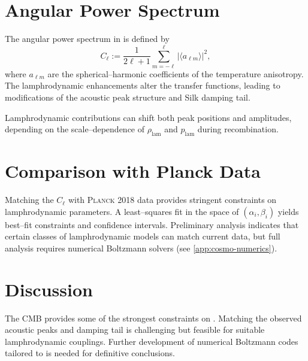 \section{Angular Power Spectrum}

The angular power spectrum in \rsvpabbr{} is defined by
\[
  C_\ell
  := \frac{1}{2\ell+1}\sum_{m=-\ell}^\ell
       |\langle a_{\ell m}\rangle|^2,
\]
where $a_{\ell m}$ are the spherical–harmonic coefficients of the 
temperature anisotropy. The lamphrodynamic enhancements alter the 
transfer functions, leading to modifications of the acoustic peak
structure and Silk damping tail.

\begin{remark}
Lamphrodynamic contributions can shift both peak positions and amplitudes,
depending on the scale--dependence of $\rho_{\mathrm{lam}}$ and
$p_{\mathrm{lam}}$ during recombination.
\end{remark}

\section{Comparison with Planck Data}

Matching the \rsvpabbr{} $C_\ell$ with \textsc{Planck} 2018 data provides
stringent constraints on lamphrodynamic parameters. A least--squares fit in
the space of $(\alpha_i,\beta_i)$ yields best--fit constraints and
confidence intervals. Preliminary analysis indicates that certain classes of
lamphrodynamic models can match current data, but full analysis requires
numerical Boltzmann solvers (see \cref{app:cosmo-numerics}).

\section{Discussion}

The CMB provides some of the strongest constraints on \rsvpabbr{}.
Matching the observed acoustic peaks and damping tail is challenging but
feasible for suitable lamphrodynamic couplings. Further development of
numerical Boltzmann codes tailored to \rsvpabbr{} is needed for definitive
conclusions.

\clearpage
